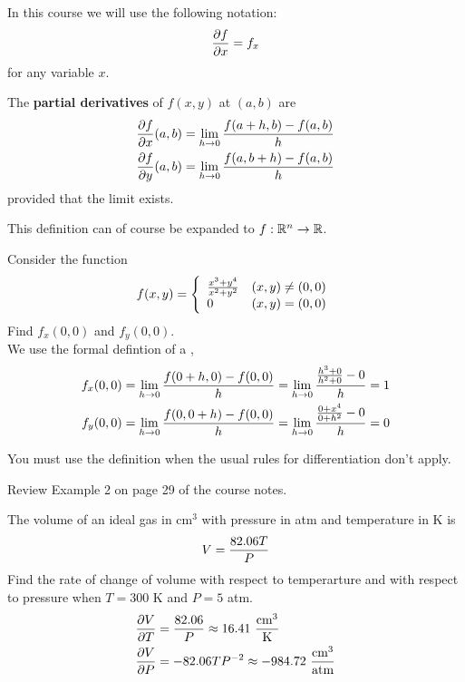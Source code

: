 \documentclass[english, 11pt]{article}
\begin{document}
  \begin{notation}
    In this course we will use the following notation:
    \[ \frac{\partial f}{\partial x} = f_x\]
    for any variable $x$.
  \end{notation}

  \begin{defn}\label{partialderivative}
    The \textbf{partial derivatives} of $f(x,y)$ at $(a,b)$ are
    \begin{align*}
      \frac{\partial f}{\partial x} (a,b)  &= \lim_{h \rightarrow 0} \frac{f(a+h,b)-f(a,b)}{h} \\
      \frac{\partial f}{\partial y} (a,b)  &= \lim_{h \rightarrow 0} \frac{f(a,b+h) - f(a,b)}{h}
    \end{align*}
    provided that the limit exists.
  \end{defn}

  \begin{note}
    This definition can of course be expanded to $f : {\mathbb{R}}^n \rightarrow {\mathbb{R}}$.
  \end{note}

  \begin{exmp}
    Consider the function
    \[ f(x,y) = \left\{ \begin{array}{lr} \frac{x^3+y^4}{x^2+y^2} & \mbox{$(x,y) \not = (0,0)$} \\ 0 & \mbox{$(x,y) = (0,0)$} \end{array} \right. \]
    Find $f_x(0,0)$ and $f_y(0,0)$. \\
    We use the formal defintion of a ,
    \begin{align*}
      f_x(0,0) & = \lim_{h \rightarrow 0} \frac{f(0+h,0)-f(0,0)}{h} = \lim_{h \rightarrow 0} \frac{\frac{h^3+0}{h^2+0}-0}{h} = 1 \\
      f_y(0,0) & = \lim_{h \rightarrow 0} \frac{f(0,0+h)-f(0,0)}{h} = \lim_{h \rightarrow 0} \frac{\frac{0+x^4}{0 +h^2}-0}{h} = 0
    \end{align*}
  \end{exmp}

  \begin{note}
    You must use the definition when the usual rules for differentiation don't apply.
  \end{note}

  \begin{exmp}
    Review Example 2 on page 29 of the course notes.
  \end{exmp}

  \begin{exmp}
     The volume of an ideal gas in $\mbox{cm}^3$ with pressure in atm and temperature in K is
     \[ V = \frac{82.06T}{P} \]
     Find the rate of change of volume with respect to temperarture and with respect to pressure when $T = 300$ K and $P = 5$ atm.
     \begin{align*}
       \f{\di V}{\di T} &= \f{82.06}{P} \approx 16.41 \ \f{\mbox{cm}^3}{\mbox{K}} \\
       \f{\di V}{\di P} &= -82.06TP^{-2} \approx -984.72 \ \f{\mbox{cm}^3}{\mbox{atm}}
     \end{align*}
  \end{exmp}
\end{document}
